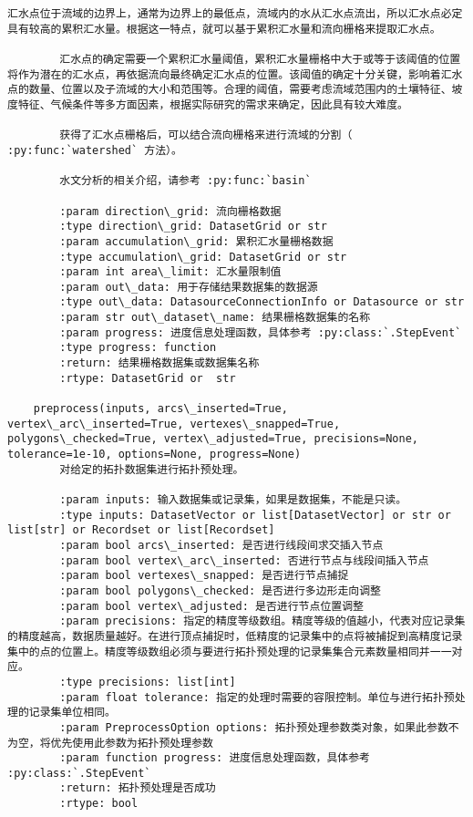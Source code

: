 \documentclass[11pt]{article}
\begin{document}
\begin{Verbatim}[commandchars=\\\{\}]
        汇水点位于流域的边界上，通常为边界上的最低点，流域内的水从汇水点流出，所以汇水点必定具有较高的累积汇水量。根据这一特点，就可以基于累积汇水量和流向栅格来提取汇水点。
        
        汇水点的确定需要一个累积汇水量阈值，累积汇水量栅格中大于或等于该阈值的位置将作为潜在的汇水点，再依据流向最终确定汇水点的位置。该阈值的确定十分关键，影响着汇水点的数量、位置以及子流域的大小和范围等。合理的阈值，需要考虑流域范围内的土壤特征、坡度特征、气候条件等多方面因素，根据实际研究的需求来确定，因此具有较大难度。
        
        获得了汇水点栅格后，可以结合流向栅格来进行流域的分割（ :py:func:`watershed` 方法）。
        
        水文分析的相关介绍，请参考 :py:func:`basin`
        
        :param direction\_grid: 流向栅格数据
        :type direction\_grid: DatasetGrid or str
        :param accumulation\_grid: 累积汇水量栅格数据
        :type accumulation\_grid: DatasetGrid or str
        :param int area\_limit: 汇水量限制值
        :param out\_data: 用于存储结果数据集的数据源
        :type out\_data: DatasourceConnectionInfo or Datasource or str
        :param str out\_dataset\_name: 结果栅格数据集的名称
        :param progress: 进度信息处理函数，具体参考 :py:class:`.StepEvent`
        :type progress: function
        :return: 结果栅格数据集或数据集名称
        :rtype: DatasetGrid or  str
    
    preprocess(inputs, arcs\_inserted=True, vertex\_arc\_inserted=True, vertexes\_snapped=True, polygons\_checked=True, vertex\_adjusted=True, precisions=None, tolerance=1e-10, options=None, progress=None)
        对给定的拓扑数据集进行拓扑预处理。
        
        :param inputs: 输入数据集或记录集，如果是数据集，不能是只读。
        :type inputs: DatasetVector or list[DatasetVector] or str or list[str] or Recordset or list[Recordset]
        :param bool arcs\_inserted: 是否进行线段间求交插入节点
        :param bool vertex\_arc\_inserted: 否进行节点与线段间插入节点
        :param bool vertexes\_snapped: 是否进行节点捕捉
        :param bool polygons\_checked: 是否进行多边形走向调整
        :param bool vertex\_adjusted: 是否进行节点位置调整
        :param precisions: 指定的精度等级数组。精度等级的值越小，代表对应记录集的精度越高，数据质量越好。在进行顶点捕捉时，低精度的记录集中的点将被捕捉到高精度记录集中的点的位置上。精度等级数组必须与要进行拓扑预处理的记录集集合元素数量相同并一一对应。
        :type precisions: list[int]
        :param float tolerance: 指定的处理时需要的容限控制。单位与进行拓扑预处理的记录集单位相同。
        :param PreprocessOption options: 拓扑预处理参数类对象，如果此参数不为空，将优先使用此参数为拓扑预处理参数
        :param function progress: 进度信息处理函数，具体参考 :py:class:`.StepEvent`
        :return: 拓扑预处理是否成功
        :rtype: bool
    

\end{Verbatim}
\end{document}
